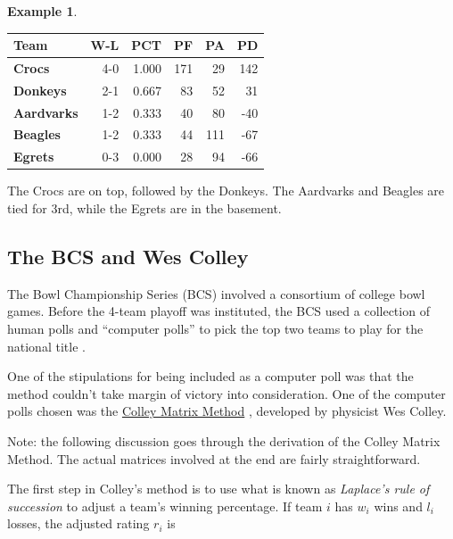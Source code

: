 \documentclass[
]{book}
\theoremstyle{definition}
\theoremstyle{definition}
\newtheorem{example}{Example}[chapter]
\theoremstyle{definition}
\theoremstyle{definition}
\theoremstyle{remark}
\begin{document}
\begin{examplebox}
\begin{example}
\begin{longtable}[]{@{}lrrrrr@{}}
\toprule\noalign{}
\textbf{Team} & \textbf{W-L} & \textbf{PCT} & \textbf{PF} & \textbf{PA} & \textbf{PD} \\
\midrule\noalign{}
\endhead
\bottomrule\noalign{}
\endlastfoot
\textbf{Crocs} & 4-0 & 1.000 & 171 & 29 & 142 \\
\textbf{Donkeys} & 2-1 & 0.667 & 83 & 52 & 31 \\
\textbf{Aardvarks} & 1-2 & 0.333 & 40 & 80 & -40 \\
\textbf{Beagles} & 1-2 & 0.333 & 44 & 111 & -67 \\
\textbf{Egrets} & 0-3 & 0.000 & 28 & 94 & -66 \\
\end{longtable}

The Crocs are on top, followed by the Donkeys. The Aardvarks and Beagles are tied for 3rd, while the Egrets are in the basement.
\end{example}

\end{examplebox}

\subsection*{The BCS and Wes Colley}\label{the-bcs-and-wes-colley}

The Bowl Championship Series (BCS) involved a consortium of college bowl games. Before the 4-team playoff was instituted, the BCS used a collection of human polls and ``computer polls'' to pick the top two teams to play for the national title \autocite{BCS}.

One of the stipulations for being included as a computer poll was that the method couldn't take margin of victory into consideration. One of the computer polls chosen was the \href{https://www.colleyrankings.com/}{Colley Matrix Method} \autocite{Colley}, developed by physicist Wes Colley.

\begin{notebox}
Note: the following discussion goes through the derivation of the Colley Matrix Method. The actual matrices involved at the end are fairly straightforward.

\end{notebox}

The first step in Colley's method is to use what is known as \emph{Laplace's rule of succession} \autocite[see][]{OA} to adjust a team's winning percentage. If team \(i\) has \(w_i\) wins and \(l_i\) losses, the adjusted rating \(r_i\) is
\end{document}
